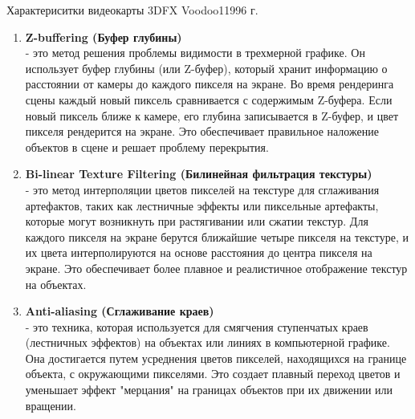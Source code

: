 \documentclass{beamer}
\begin{document}
\begin{frame}{Характериситки видеокарты 3DFX Voodoo1}{1996 г.}
{{\begin{enumerate}
	\item
	\textbf{Z-buffering (Буфер глубины)} \\
	- это метод решения проблемы видимости в трехмерной графике. Он использует буфер глубины (или Z-буфер), который хранит информацию о расстоянии от камеры до каждого пикселя на экране. Во время рендеринга сцены каждый новый пиксель сравнивается с содержимым Z-буфера. Если новый пиксель ближе к камере, его глубина записывается в Z-буфер, и цвет пикселя рендерится на экране. Это обеспечивает правильное наложение объектов в сцене и решает проблему перекрытия.
	
	\item
	\textbf{Bi-linear Texture Filtering (Билинейная фильтрация текстуры) } \\
	- это метод интерполяции цветов пикселей на текстуре для сглаживания артефактов, таких как лестничные эффекты или пиксельные артефакты, которые могут возникнуть при растягивании или сжатии текстур. Для каждого пикселя на экране берутся ближайшие четыре пикселя на текстуре, и их цвета интерполируются на основе расстояния до центра пикселя на экране. Это обеспечивает более плавное и реалистичное отображение текстур на объектах.
	\item
	\textbf{Anti-aliasing (Сглаживание краев)} \\
	- это техника, которая используется для смягчения ступенчатых краев (лестничных эффектов) на объектах или линиях в компьютерной графике. Она достигается путем усреднения цветов пикселей, находящихся на границе объекта, с окружающими пикселями. Это создает плавный переход цветов и уменьшает эффект "мерцания" на границах объектов при их движении или вращении.
\end{enumerate}
}
}
\end{frame}
\end{document}

